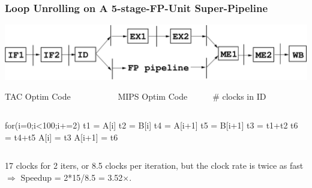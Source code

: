 \documentclass{beamer}
\renewcommand{\emph}[1]{\textcolor{structure}{#1}}
\newcommand{\emp}[1]{\textcolor{DikuRed}{ #1}}
\begin{document}
\begin{frame}[fragile,t]
    \frametitle{Loop Unrolling on A 5-stage-FP-Unit Super-Pipeline}

\includegraphics[width=50ex]{Figures/SuperPipeline}

\begin{block}{TAC Optim Code{\tt~~~~~~~~~~~}MIPS Optim Code~~~~~~\# clocks in ID}\vspace{-2ex}
\begin{columns}
\begin{colorcode}[fontsize=\scriptsize]
for(i=0;i<100;i+=2)
  t1 = \emph{A[i]}
  t2 = \emph{B[i]}
  t4 = \emph{A[i+1]}
  t5 = \emph{B[i+1]}
  t3 = t1+t2
  t6 = t4+t5
  \emp{A[i]} = t3
  \emp{A[i+1]} = t6
\end{colorcode}
\end{columns}
\end{block}
\smallskip 

17 clocks for 2 iters, or 8.5 clocks per iteration, but the clock rate 
is twice as fast $\Rightarrow$ Speedup = 2*15/8.5 = 3.52$\times$.

\end{frame}
\end{document}
